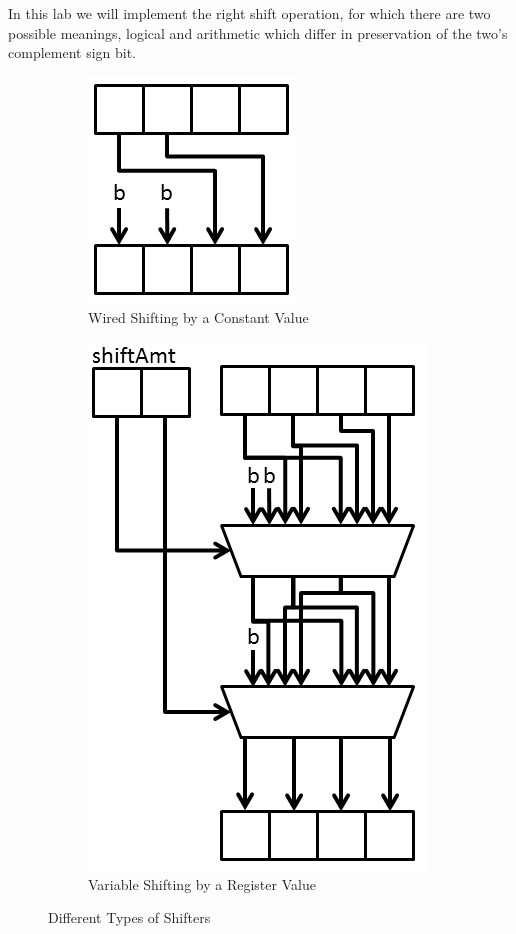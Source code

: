 \documentclass{article}
\begin{document}
In this lab we will implement the right shift operation, for which there are two
possible meanings, logical and arithmetic which differ in preservation of the
two's complement sign bit.

\begin{figure}
\centering
\begin{subfigure}[b]{0.49\textwidth}
	\centering
	\includegraphics[width=0.5\linewidth]{WiredShifter.png}
	\caption{Wired Shifting by a Constant Value}
	\label{fig:wired_shifter}
\end{subfigure}
\begin{subfigure}[b]{0.49\textwidth}
	\centering
	\includegraphics[width=0.7\linewidth]{VariableShifter.png}
	\caption{Variable Shifting by a Register Value}
	\label{fig:variable_shifter}
\end{subfigure}
\caption{Different Types of Shifters}
\end{figure}
\end{document}
